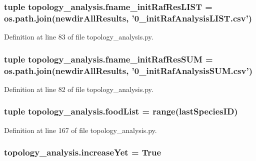 \hypertarget{a00128_ae1a425430860aba59e0118dbe1ac2163}{
\subsubsection[{fname\-\_\-init\-Raf\-Res\-L\-I\-S\-T}]{\setlength{\rightskip}{0pt plus 5cm}tuple topology\-\_\-analysis.\-fname\-\_\-init\-Raf\-Res\-L\-I\-S\-T = os.\-path.\-join({\bf newdir\-All\-Results}, '0\-\_\-init\-Raf\-Analysis\-L\-I\-S\-T.\-csv')}}\label{a00128_ae1a425430860aba59e0118dbe1ac2163}


Definition at line 83 of file topology\-\_\-analysis.\-py.

\hypertarget{a00128_ac3f3b9f72351b39261d33caf3d22d03e}{
\subsubsection[{fname\-\_\-init\-Raf\-Res\-S\-U\-M}]{\setlength{\rightskip}{0pt plus 5cm}tuple topology\-\_\-analysis.\-fname\-\_\-init\-Raf\-Res\-S\-U\-M = os.\-path.\-join({\bf newdir\-All\-Results}, '0\-\_\-init\-Raf\-Analysis\-S\-U\-M.\-csv')}}\label{a00128_ac3f3b9f72351b39261d33caf3d22d03e}


Definition at line 82 of file topology\-\_\-analysis.\-py.

\hypertarget{a00128_a96850fa3d62df1176a8d7a5b988f4a32}{
\subsubsection[{food\-List}]{\setlength{\rightskip}{0pt plus 5cm}tuple topology\-\_\-analysis.\-food\-List = range({\bf last\-Species\-I\-D})}}\label{a00128_a96850fa3d62df1176a8d7a5b988f4a32}


Definition at line 167 of file topology\-\_\-analysis.\-py.

\hypertarget{a00128_a5a68ea0f110f2fae7b8f03d1ce52d54d}{
\subsubsection[{increase\-Yet}]{\setlength{\rightskip}{0pt plus 5cm}topology\-\_\-analysis.\-increase\-Yet = True}}\label{a00128_a5a68ea0f110f2fae7b8f03d1ce52d54d}


